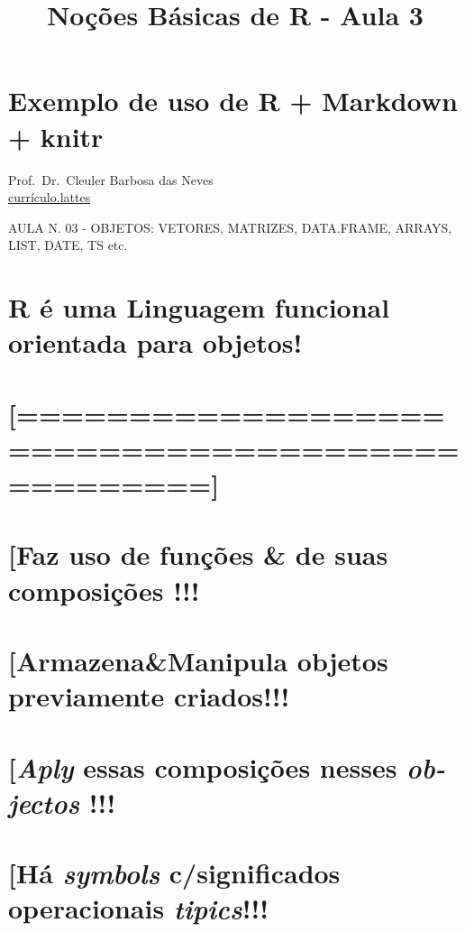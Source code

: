 \documentclass[]{article}
\title{Noções Básicas de R - Aula 3}
\author{}
\date{}
\begin{document}
\maketitle

\section{Exemplo de uso de R + Markdown +
knitr}\label{exemplo-de-uso-de-r-markdown-knitr}

Prof.~Dr.~Cleuler Barbosa das Neves\\
\href{http://buscatextual.cnpq.br/buscatextual/visualizacv.do?id=K4786159E2}{currículo.lattes}

AULA N. 03 - OBJETOS: VETORES, MATRIZES, DATA.FRAME, ARRAYS, LIST, DATE,
TS etc.

\section{\texorpdfstring{\textbf{R} é uma Linguagem \textbf{funcional}
orientada para
\textbf{objetos}!}{R é uma Linguagem funcional orientada para objetos!}}\label{r-e-uma-linguagem-funcional-orientada-para-objetos}

\section{{[}================================================{]}}\label{section}

\section{{[}Faz uso de funções \& de suas composições
!!!}\label{faz-uso-de-funcoes-de-suas-composicoes}

\section{{[}Armazena\&Manipula objetos previamente
criados!!!}\label{armazenamanipula-objetos-previamente-criados}

\section{\texorpdfstring{{[}\emph{Aply} essas composições nesses
\emph{ob-jectos}
!!!}{{[}Aply essas composições nesses ob-jectos !!!}}\label{aply-essas-composicoes-nesses-ob-jectos}

\section{\texorpdfstring{{[}Há \emph{symbols} c/significados
operacionais
\emph{tipics}!!!}{{[}Há symbols c/significados operacionais tipics!!!}}\label{ha-symbols-csignificados-operacionais-tipics}
\end{document}
